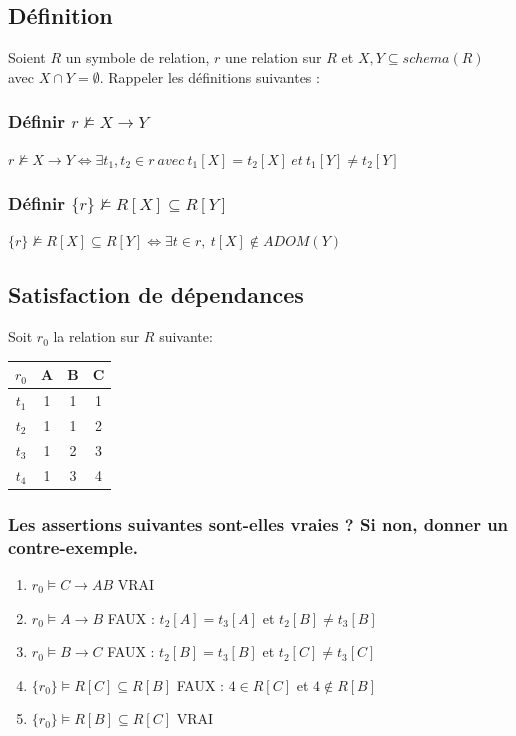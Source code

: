 \documentclass[10pt,a4paper,twoside]{article}
\begin{document}
\subsection{Définition}
Soient $R$ un symbole de relation, $r$ une relation sur $R$ et $X,Y \subseteq schema(R)$ avec $X\cap Y = \emptyset$. Rappeler les définitions suivantes :
\subsubsection{Définir $r \not\models X\rightarrow Y$}
$r \not\models X\rightarrow Y \Leftrightarrow \exists t_{1},t_{2} \in r\ avec\ t_{1}[X]=t_{2}[X]\ et\ t_{1}[Y]\neq t_{2}[Y]$

\subsubsection{Définir $\{r\} \not\models R[X]\subseteq R[Y]$}
$\{r\} \not\models R[X]\subseteq R[Y] \Leftrightarrow \exists t \in r,\ t[X] \not\in ADOM(Y)$

\subsection{Satisfaction de dépendances}
Soit $r_{0}$ la relation sur $R$ suivante:
\begin{tabular}{c|ccc}
$r_{0}$ & A & B & C \\ 
\hline 
$t_{1}$ & 1 & 1 & 1 \\ 
$t_{2}$ & 1 & 1 & 2 \\ 
$t_{3}$ & 1 & 2 & 3 \\ 
$t_{4}$ & 1 & 3 & 4 \\ 
\end{tabular} 

\subsubsection{Les assertions suivantes sont-elles vraies ? Si non, donner un contre-exemple.}
\begin{enumerate}
\item $r_{0} \models C \rightarrow AB$ VRAI
\item $r_{0} \models A \rightarrow B$ FAUX : $t_{2}[A]=t_{3}[A]$ et $t_{2}[B]\neq t_{3}[B]$
\item $r_{0} \models B \rightarrow C$ FAUX : $t_{2}[B]=t_{3}[B]$ et $t_{2}[C]\neq t_{3}[C]$
\item $\{r_{0}\}\models R[C] \subseteq R[B]$ FAUX : $4 \in R[C]$ et $4 \not\in R[B]$
\item $\{r_{0}\}\models R[B] \subseteq R[C]$ VRAI
\end{enumerate}
\end{document}
